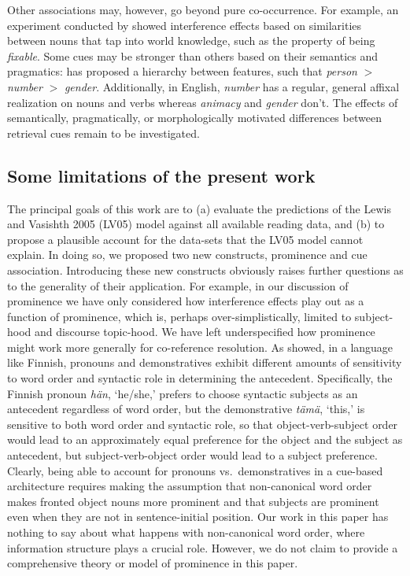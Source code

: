 \documentclass{cambridge7A}\usepackage[]{graphicx}\usepackage[]{color}
\begin{document}
Other associations may, however, go beyond pure co-occurrence. 
For example, an experiment conducted by \cite{VanDyke2006} showed interference effects based on similarities between nouns that tap into world knowledge, such as the property of being \emph{fixable}. Some cues may be stronger than others based on their semantics and pragmatics: \cite{CarminatiNella2005} has proposed a hierarchy between features, such that \textit{person} $>$ \textit{number} $>$ \textit{gender}.
Additionally, in English, \textit{number} has a regular, general affixal realization on nouns and verbs whereas \textit{animacy} and \textit{gender} don't. The effects of semantically, pragmatically, or morphologically motivated differences between retrieval cues remain to be investigated.

\subsection{Some limitations of the present work} \label{limitations}

The principal goals of this work are to (a) evaluate the predictions of the Lewis and Vasishth 2005 (LV05) model against all available reading data, and (b) to propose a plausible account for the data-sets that the LV05 model cannot explain. In doing so, we proposed two new constructs, prominence and cue association. Introducing these new constructs obviously raises further questions as to the generality of their application. For example, in our discussion of prominence we have only considered how interference effects play out as a function of prominence, which is, perhaps over-simplistically, limited to subject-hood and discourse topic-hood.
\label{prominencelimitationspageref}
We have left underspecified how prominence might work more generally for co-reference resolution. As \cite{kaiser2008interpreting} showed, in a language like Finnish, pronouns and demonstratives exhibit different amounts of sensitivity to word order and syntactic role in determining the antecedent. Specifically, the Finnish pronoun \textit{h\"an}, `he/she,' prefers to choose syntactic subjects as an antecedent regardless of word order, but the demonstrative \textit{t\"am\"a}, `this,' is sensitive to both word order and syntactic role, so that object-verb-subject order would lead to an approximately equal preference for the object and the subject as antecedent, but subject-verb-object order would lead to a subject preference. Clearly, being able to account for pronouns vs.\ demonstratives in a cue-based architecture requires making the assumption that non-canonical word order makes fronted object nouns more prominent and that subjects are prominent even when they are not in sentence-initial position. Our work in this paper has nothing to say about what happens with non-canonical word order, where information structure plays a crucial role. However, we do not claim to provide a comprehensive theory or model of prominence in this paper. 
\end{document}
